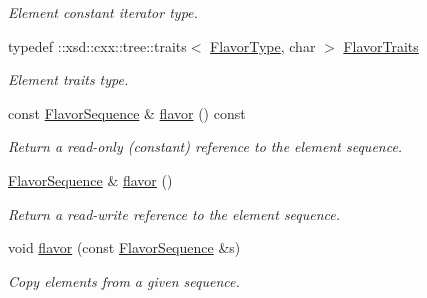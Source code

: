 \begin{DoxyCompactItemize}
\begin{DoxyCompactList}\small\item\em Element constant iterator type. \item\end{DoxyCompactList}\item 
\hypertarget{classopenstack_1_1xml_1_1Flavors_ae2d961efc28bc638082b625aea264dd5}{
typedef ::xsd::cxx::tree::traits$<$ \hyperlink{classopenstack_1_1xml_1_1Flavor}{FlavorType}, char $>$ \hyperlink{classopenstack_1_1xml_1_1Flavors_ae2d961efc28bc638082b625aea264dd5}{FlavorTraits}}
\label{classopenstack_1_1xml_1_1Flavors_ae2d961efc28bc638082b625aea264dd5}

\begin{DoxyCompactList}\small\item\em Element traits type. \item\end{DoxyCompactList}\item 
const \hyperlink{classopenstack_1_1xml_1_1Flavors_a6dcb5da00dc0310b0bae660aa5d40409}{FlavorSequence} \& \hyperlink{classopenstack_1_1xml_1_1Flavors_af0603e366a8a9bdb7d60310f13f98662}{flavor} () const 
\begin{DoxyCompactList}\small\item\em Return a read-\/only (constant) reference to the element sequence. \item\end{DoxyCompactList}\item 
\hyperlink{classopenstack_1_1xml_1_1Flavors_a6dcb5da00dc0310b0bae660aa5d40409}{FlavorSequence} \& \hyperlink{classopenstack_1_1xml_1_1Flavors_a7b32756ca00b7db69744a132ad7114c1}{flavor} ()
\begin{DoxyCompactList}\small\item\em Return a read-\/write reference to the element sequence. \item\end{DoxyCompactList}\item 
void \hyperlink{classopenstack_1_1xml_1_1Flavors_afc27556b27131ef775f2ea1a498492e2}{flavor} (const \hyperlink{classopenstack_1_1xml_1_1Flavors_a6dcb5da00dc0310b0bae660aa5d40409}{FlavorSequence} \&s)
\begin{DoxyCompactList}\small\item\em Copy elements from a given sequence. \item\end{DoxyCompactList}\end{DoxyCompactItemize}

